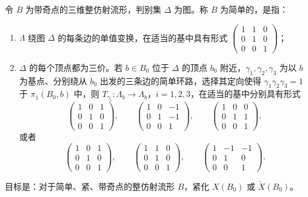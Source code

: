 \begin{definition}\label{def:6.95}
令 $B$ 为带奇点的三维整仿射流形，判别集 $\Delta$ 为图。称 $B$ 为简单的，是指：
\begin{enumerate}[label=(\arabic*)]
\item $\Lambda$ 绕图 $\Delta$ 的每条边的单值变换，在适当的基中具有形式 $\begin{pmatrix}1&1&0\\0&1&0\\0&0&1\end{pmatrix}$；
\item $\Delta$ 的每个顶点都为三价。若 $b\in B_0$ 位于 $\Delta$ 的顶点 $b_0$ 附近，$\gamma_1,\gamma_2,\gamma_3$ 为以 $b$ 为基点、分别绕从 $b_0$ 出发的三条边的简单环路，选择其定向使得 $\gamma_1\gamma_2\gamma_3=1$ 于 $\pi_1(B_0,b)$ 中，则 $T_{\gamma_i}\colon\Lambda_b\to\Lambda_b$，$i=1,2,3$，在适当的基中分别具有形式
\[
\begin{pmatrix}1&0&1\\0&1&0\\0&0&1\end{pmatrix},\qquad
\begin{pmatrix}1&0&-1\\0&1&-1\\0&0&1\end{pmatrix},\qquad
\begin{pmatrix}1&0&0\\0&1&1\\0&0&1\end{pmatrix},
\]
或者
\[
\begin{pmatrix}1&0&1\\0&1&0\\0&0&1\end{pmatrix},\qquad
\begin{pmatrix}1&1&0\\0&1&0\\0&0&1\end{pmatrix},\qquad
\begin{pmatrix}1&-1&-1\\0&1&0\\0&0&1\end{pmatrix}.
\]
\end{enumerate}
\end{definition}

目标是：对于简单、紧、带奇点的整仿射流形 $B$，紧化 $X(B_0)$ 或 $\check X(B_0)$。

